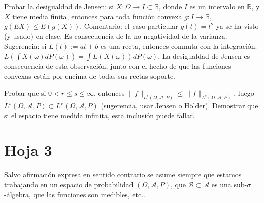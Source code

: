 \begin{problem}[9]Probar la desigualdad de Jensen: si $X:\Omega\to I\subset \mathbb{R}$, donde
$I$ es un intervalo en $\mathbb{R}$, y $X$ tiene media finita, entonces para toda funci\'on
convexa $g:I\to \mathbb{R}$, $g(EX) \le E(g(X))$. Comentario: el caso particular $g(t) = t^2$
ya se ha visto (y usado) en clase. Es consecuencia de la no negatividad de la varianza.
Sugerencia: si $L(t) := a t + b$ es una recta, entonces conmuta con la integraci\'on:
$L(\int X(\omega) dP (\omega)) = \int L (X(\omega)) dP (\omega)$. La desigualdad de Jensen
es consecuencia de esta observaci\'on, junto con el hecho de que las funciones convexas
est\'an por encima de todas sus rectas soporte.
\solution

\begin{expla}

\end{expla}

\end{problem}


\begin{problem}[10]Probar que si $0 < r\le s \le \infty$,
 entonces $\|f\|_{L^r(\Omega, \mathcal{A}, P)}\le \|f\|_{L^s(\Omega, \mathcal{A}, P)}$, luego $L^s(\Omega, \mathcal{A}, P) \subset L^r(\Omega, \mathcal{A}, P)$ (sugerencia, usar Jensen o H\"older). Demostrar que si el espacio tiene medida infinita, esta
inclusi\'on puede fallar.
\solution

\begin{expla}

\end{expla}

\end{problem}



\newpage
\section{Hoja 3}

Salvo afirmaci\'on expresa en sentido
contrario se asume siempre que estamos trabajando en un espacio de probabilidad $(\Omega, \mathcal{A}, P)$,
que  $\mathcal{B}\subset \mathcal{A}$ es una sub-$\sigma$-\'algebra, que las funciones son medibles, etc..



